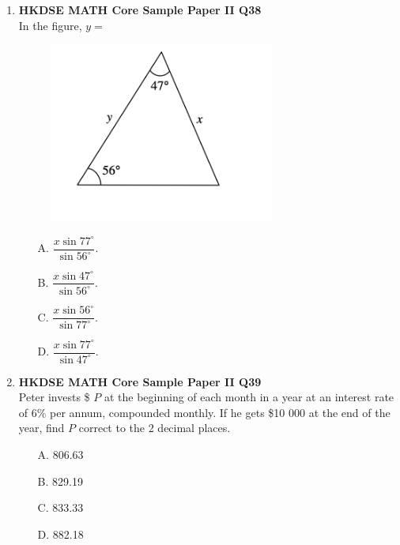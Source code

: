 \documentclass[12pt]{article}
\begin{document}
\begin{enumerate}
	\item \textbf{HKDSE MATH Core Sample Paper II Q38}\\
	In the figure, $y = $
	\begin{figure}[H]
		\centering
		\includegraphics[width = 0.7\textwidth]{SPFigure2.38.png}	
	\end{figure}
	\begin{enumerate}
		\item[A.] $\dfrac{x\sin{77^\circ}}{\sin{56^\circ}}$.
		\item[B.] $\dfrac{x\sin{47^\circ}}{\sin{56^\circ}}$.
		\item[C.] $\dfrac{x\sin{56^\circ}}{\sin{77^\circ}}$.
		\item[D.] $\dfrac{x\sin{77^\circ}}{\sin{47^\circ}}$.
	\end{enumerate}
	
	\item \textbf{HKDSE MATH Core Sample Paper II Q39}\\
	Peter invests \$ $P$ at the beginning of each month in a year at an interest rate of 6\% per annum, compounded monthly. If he gets \$10 000 at the end of the year, find $P$ correct to the 2 decimal places.
	\begin{enumerate}
		\item[A.] 806.63
		\item[B.] 829.19
		\item[C.] 833.33
		\item[D.] 882.18
	\end{enumerate}
	

\end{enumerate}
\end{document}
